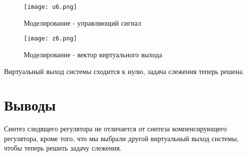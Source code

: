 \begin{figure}[ht]
  \centering
  \texttt{[image: u6.png]}
  \caption{Моделирование - управляющий сигнал}
\end{figure}

\begin{figure}[ht]
  \centering
  \texttt{[image: z6.png]}
  \caption{Моделирование - вектор виртуального выхода}
\end{figure}

Виртуальный выход системы сходится к нулю, задача слежения теперь решена.

\section{Выводы}

Синтез следящего регулятора не отличается от синтеза компенсирующего регулятора, кроме того, что мы выбрали другой виртуальный выход системы, чтобы теперь 
решить задачу слежения.
\endinput 